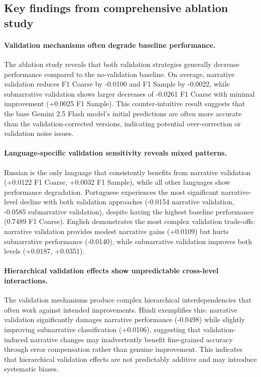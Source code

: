 \subsection{Key findings from comprehensive ablation study}

\paragraph{Validation mechanisms often degrade baseline performance.} The ablation study reveals that both validation strategies generally decrease performance compared to the no-validation baseline. On average, narrative validation reduces F1 Coarse by -0.0100 and F1 Sample by -0.0022, while subnarrative validation shows larger decreases of -0.0261 F1 Coarse with minimal improvement (+0.0025 F1 Sample). This counter-intuitive result suggests that the base Gemini 2.5 Flash model's initial predictions are often more accurate than the validation-corrected versions, indicating potential over-correction or validation noise issues.

\paragraph{Language-specific validation sensitivity reveals mixed patterns.} Russian is the only language that consistently benefits from narrative validation (+0.0122 F1 Coarse, +0.0032 F1 Sample), while all other languages show performance degradation. Portuguese experiences the most significant narrative-level decline with both validation approaches (-0.0154 narrative validation, -0.0585 subnarrative validation), despite having the highest baseline performance (0.7489 F1 Coarse). English demonstrates the most complex validation trade-offs: narrative validation provides modest narrative gains (+0.0109) but hurts subnarrative performance (-0.0140), while subnarrative validation improves both levels (+0.0187, +0.0351).

\paragraph{Hierarchical validation effects show unpredictable cross-level interactions.} The validation mechanisms produce complex hierarchical interdependencies that often work against intended improvements. Hindi exemplifies this: narrative validation significantly damages narrative performance (-0.0498) while slightly improving subnarrative classification (+0.0106), suggesting that validation-induced narrative changes may inadvertently benefit fine-grained accuracy through error compensation rather than genuine improvement. This indicates that hierarchical validation effects are not predictably additive and may introduce systematic biases.

